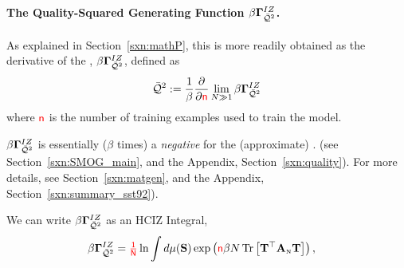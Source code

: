 \paragraph{The Quality-Squared Generating Function $\beta\mathbf{\Gamma}^{IZ}_{\bar{\mathcal{Q}}^{2}}$.}
As explained in Section~\ref{sxn:mathP}, this \QualitySquared is more readily obtained as 
the derivative of the \LayerQualitySquared \GeneratingFunction, $\beta\mathbf{\Gamma}^{IZ}_{\bar{\mathcal{Q}}^{2}}$, defined as
\begin{align}
  \label{eqn:IZG_QT}
  \bar{\mathcal{Q}}^{2} := \dfrac{1}{\beta}\dfrac{\partial }{\partial {\color{red}\sf{n}}} \lim_{N\gg 1}\beta\mathbf{\Gamma}^{IZ}_{\bar{\mathcal{Q}}^{2}}
\end{align}
where ${\color{red}\sf{n}}$ is the number of training examples used to train the model.

$\beta\mathbf{\Gamma}^{IZ}_{\bar{\mathcal{Q}}^{2}}$ is essentially ($\beta$ times) a \emph{negative \FreeEnergy} for the (approximate) \LayerQualitySquared.
(see Section~\ref{sxn:SMOG_main}, and the Appendix, Section~\ref{sxn:quality}).
For more details, see Section~\ref{sxn:matgen}, and the Appendix, Section~\ref{sxn:summary_sst92}).

We can write $\beta\mathbf{\Gamma}^{IZ}_{\bar{\mathcal{Q}}^{2}}$ as an HCIZ Integral, 
\begin{align}
  \label{eqn:QT_dS}
  \beta\mathbf{\Gamma}^{IZ}_{\bar{\mathcal{Q}}^{2}}  &= {\color{red}\sf{\tfrac{1}{N}}} \ln\int d\mu({\mathbf{S}})\exp\left({\color{red}\sf{n}} \beta N\mbox{}\operatorname{Tr}\left[{\mathbf{T}}^{\top}{\mathbf{A}}_{\text{\tiny N}}{\mathbf{T}}\right]\right),
\end{align}

